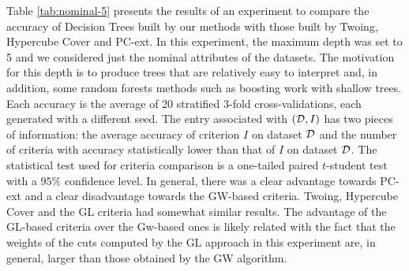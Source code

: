 Table \ref{tab:nominal-5} presents  the results of an experiment to
compare the accuracy of  Decision Trees built by  our methods with those built by Twoing, Hypercube Cover and PC-ext.
In this experiment, the maximum depth was set to 5 and we considered just the nominal attributes of the datasets. 
The motivation for this depth is to produce trees that
are relatively easy to interpret and, in addition, some random
forests methods such as boosting work with shallow trees.
Each accuracy is the average of 20 stratified 3-fold cross-validations,
each generated with a different seed.
The entry  associated with  $({\cal D},I)$ has two pieces of information: the average accuracy
of criterion $I$ on dataset ${\cal D}$ and the number of criteria
with accuracy   statistically lower than that of $I$ on dataset ${\cal D}$. 
The statistical test used for criteria comparison is a  one-tailed paired $t$-student test with a $95\% $ confidence level. 
In general, there was a clear advantage towards PC-ext and a clear disadvantage towards the GW-based criteria. Twoing, Hypercube Cover and the GL criteria had somewhat similar results. The advantage of the GL-based criteria over the Gw-based ones is likely related with the fact that the weights of the cuts computed by the GL approach in this experiment are, in general, larger than those obtained by the GW algorithm.


